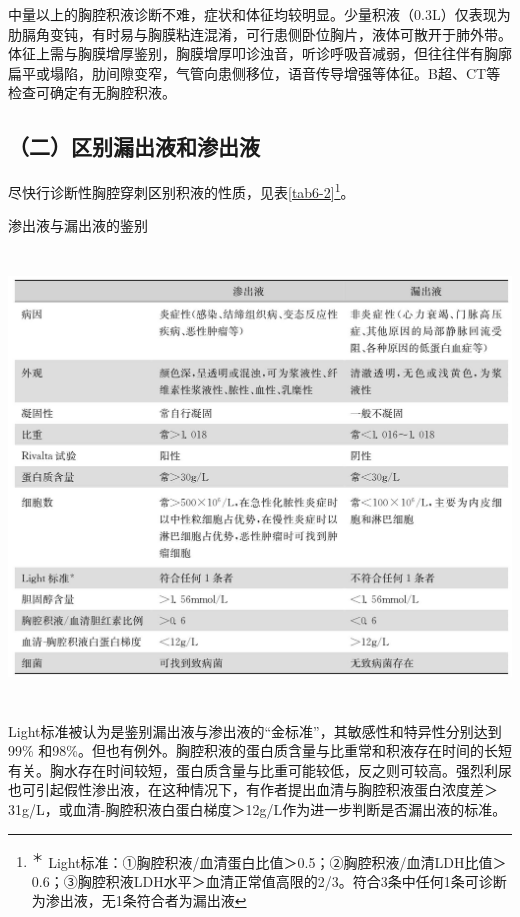 中量以上的胸腔积液诊断不难，症状和体征均较明显。少量积液（0.3L）仅表现为肋膈角变钝，有时易与胸膜粘连混淆，可行患侧卧位胸片，液体可散开于肺外带。体征上需与胸膜增厚鉴别，胸膜增厚叩诊浊音，听诊呼吸音减弱，但往往伴有胸廓扁平或塌陷，肋间隙变窄，气管向患侧移位，语音传导增强等体征。B超、CT等检查可确定有无胸腔积液。

\subsection{（二）区别漏出液和渗出液}

尽快行诊断性胸腔穿刺区别积液的性质，见表\ref{tab6-2}\footnote{\textsuperscript{＊}
Light标准：①胸腔积液/血清蛋白比值＞0.5；②胸腔积液/血清LDH比值＞0.6；③胸腔积液LDH水平＞血清正常值高限的2/3。符合3条中任何1条可诊断为渗出液，无1条符合者为漏出液}。

\begin{table}[htbp]
\centering
\caption{渗出液与漏出液的鉴别}
\label{tab6-2}
\includegraphics[width=5.94792in,height=4.71875in]{./images/Image00050.jpg}
\end{table}

Light标准被认为是鉴别漏出液与渗出液的“金标准”，其敏感性和特异性分别达到99\%
和98\%。但也有例外。胸腔积液的蛋白质含量与比重常和积液存在时间的长短有关。胸水存在时间较短，蛋白质含量与比重可能较低，反之则可较高。强烈利尿也可引起假性渗出液，在这种情况下，有作者提出血清与胸腔积液蛋白浓度差＞31g/L，或血清-胸腔积液白蛋白梯度＞12g/L作为进一步判断是否漏出液的标准。

